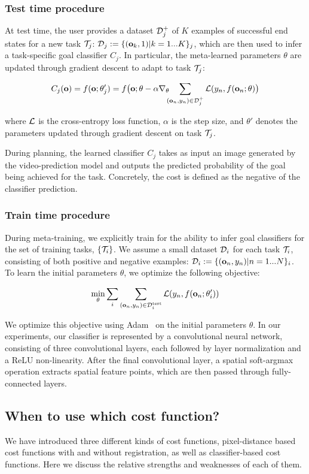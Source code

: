 \subsubsection{Test time procedure}
At test time, the user provides a dataset $\mathcal{D}^+_j$ of $K$ examples of successful end states for a new task $\mathcal{T}_j$: $\mathcal{D}_j:=\{(\mathbf{o}_k, 1) | k = 1...K\}_j$, which are then used to infer a task-specific goal classifier $C_j$. In particular, the meta-learned parameters $\theta$ are updated through gradient descent to adapt to task $\mathcal{T}_j$:

$$
C_j(\mathbf{o})
= f(\mathbf{o}; \theta_j')
= f\big(\mathbf{o}; \theta-\alpha \nabla_\theta \!\!\! \sum_{(\mathbf{o}_n, y_n)\in \mathcal{D}^+_j} \mathcal{L} (y_n, f(\mathbf{o}_n; \theta)\big)
$$

where $\mathcal{L}$ is the cross-entropy loss function, $\alpha$ is the step size, and $\theta'$ denotes the parameters updated through gradient descent on task $\mathcal{T}_j$.

During planning, the learned classifier $C_j$ takes as input an image generated by the video-prediction model and outputs the predicted probability of the goal being achieved for the task. Concretely, the cost is defined as the negative of the classifier prediction.


\subsubsection{Train time procedure}
During meta-training, we explicitly train for the ability to infer goal classifiers for the set of training tasks, $\{ \mathcal{T}_i \}$. We assume a small dataset $\mathcal{D}_i$ for each task $\mathcal{T}_i$, consisting of both positive and negative examples: $\mathcal{D}_i:= \{(\mathbf{o}_n,y_n) | n=1...N \}_i$. To learn the initial parameters $\theta$, we optimize the following objective:

$$
\min_\theta \sum_i \sum_{(\mathbf{o}_n, y_n) \in \mathcal{D}^\text{test}_i} \mathcal{L}(y_n, f(\mathbf{o}_n; \theta_i')) 
$$

We optimize this objective using Adam~\cite{ADAM} on the initial parameters $\theta$. In our experiments, our classifier is represented by a convolutional neural network, consisting of three convolutional layers, each followed by layer normalization and a ReLU non-linearity. After the final convolutional layer, a spatial soft-argmax operation extracts spatial feature points, which are then passed through fully-connected layers.

\subsection{When to use which cost function?}
\label{subsec:cost_discuission}
We have introduced three different kinds of cost functions, pixel-distance based cost functions with and without registration, as well as classifier-based cost functions. Here we discuss the relative strengths and weaknesses of each of them.


